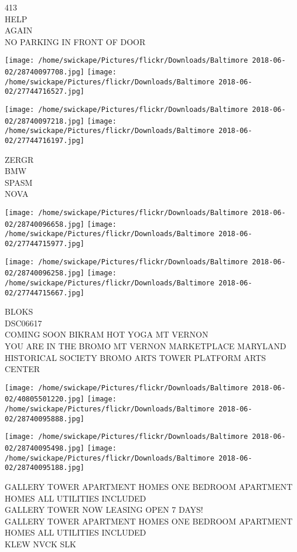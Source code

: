 \documentclass[10pt,letterpaper]{article}
\begin{document}
413\\
HELP\\
AGAIN\\
NO PARKING IN FRONT OF DOOR\\
\pagebreak

\texttt{[image: /home/swickape/Pictures/flickr/Downloads/Baltimore 2018-06-02/28740097708.jpg]}
\texttt{[image: /home/swickape/Pictures/flickr/Downloads/Baltimore 2018-06-02/27744716527.jpg]}

\texttt{[image: /home/swickape/Pictures/flickr/Downloads/Baltimore 2018-06-02/28740097218.jpg]}
\texttt{[image: /home/swickape/Pictures/flickr/Downloads/Baltimore 2018-06-02/27744716197.jpg]}

ZERGR\\
BMW\\
SPASM\\
NOVA\\
\pagebreak

\texttt{[image: /home/swickape/Pictures/flickr/Downloads/Baltimore 2018-06-02/28740096658.jpg]}
\texttt{[image: /home/swickape/Pictures/flickr/Downloads/Baltimore 2018-06-02/27744715977.jpg]}

\texttt{[image: /home/swickape/Pictures/flickr/Downloads/Baltimore 2018-06-02/28740096258.jpg]}
\texttt{[image: /home/swickape/Pictures/flickr/Downloads/Baltimore 2018-06-02/27744715667.jpg]}

BLOKS\\
DSC06617\\
COMING SOON BIKRAM HOT YOGA MT VERNON\\
YOU ARE IN THE BROMO MT VERNON MARKETPLACE MARYLAND HISTORICAL SOCIETY BROMO ARTS TOWER PLATFORM ARTS CENTER\\
\pagebreak

\texttt{[image: /home/swickape/Pictures/flickr/Downloads/Baltimore 2018-06-02/40805501220.jpg]}
\texttt{[image: /home/swickape/Pictures/flickr/Downloads/Baltimore 2018-06-02/28740095888.jpg]}

\texttt{[image: /home/swickape/Pictures/flickr/Downloads/Baltimore 2018-06-02/28740095498.jpg]}
\texttt{[image: /home/swickape/Pictures/flickr/Downloads/Baltimore 2018-06-02/28740095188.jpg]}

GALLERY TOWER APARTMENT HOMES ONE BEDROOM APARTMENT HOMES ALL UTILITIES INCLUDED\\
GALLERY TOWER NOW LEASING OPEN 7 DAYS!\\
GALLERY TOWER APARTMENT HOMES ONE BEDROOM APARTMENT HOMES ALL UTILITIES INCLUDED\\
KLEW NVCK SLK\\
\pagebreak
\end{document}
